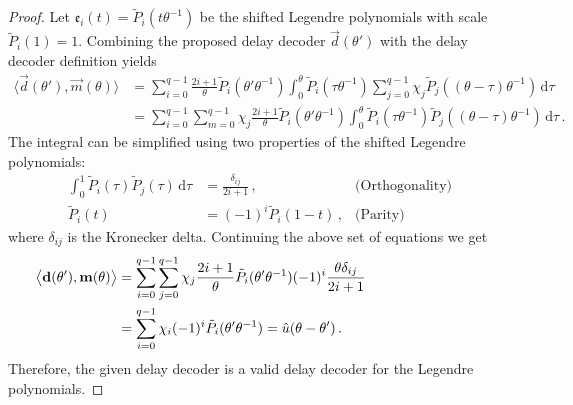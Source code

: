 \begin{proof}
	Let $\mathfrak{e}_i(t) = \tilde P_i(t \theta^{-1})$ be the shifted Legendre polynomials with scale $\tilde P_i(1) = 1$. Combining the proposed delay decoder $\vec d(\theta')$ with the delay decoder definition yields
	\begin{align*}
		\big\langle \vec d(\theta'), \vec m(\theta) \big\rangle
			&= \sum_{i = 0}^{q - 1} \frac{2i + 1}{\theta} \tilde P_i(\theta' \theta^{-1}) \int_{0}^\theta \tilde P_i(\tau \theta^{-1}) \sum_{j = 0}^{q - 1} \chi_j \tilde P_j((\theta - \tau )\theta^{-1})\,\mathrm{d}\tau \\
			&= \sum_{i = 0}^{q - 1} \sum_{m = 0}^{q - 1} \chi_j \frac{2i + 1}{\theta} \tilde P_i(\theta' \theta^{-1}) \int_{0}^\theta \tilde P_i(\tau \theta^{-1}) \tilde P_j((\theta - \tau )\theta^{-1})\,\mathrm{d}\tau \,.
	\end{align*}
	The integral can be simplified using two properties of the shifted Legendre polynomials:
	\begin{align*}
		\int_0^1 \tilde P_i(\tau) \tilde P_j(\tau) \, \mathrm{d}\tau &= \frac{\delta_{ij}}{2i + 1} \,, & \text{(Orthogonality)}  \\
		\tilde P_i(t) &= (-1)^i \tilde P_i(1 - t) \,, & \text{(Parity)}
	\end{align*}
	where $\delta_{ij}$ is the Kronecker delta. Continuing the above set of equations we get
	\begin{align*}
		\big\langle \vec d(\theta'), \vec m(\theta) \big\rangle
			&= \sum_{i = 0}^{q - 1} \sum_{j = 0}^{q - 1} \chi_j \frac{2i + 1}{\theta} \tilde P_i(\theta' \theta^{-1}) (-1)^i \frac{\theta \delta_{ij} }{2i + 1} \hspace{2.97cm}\\
			&= \sum_{i = 0}^{q - 1} \chi_i (-1)^i \tilde P_i(\theta' \theta^{-1})
			 = \hat u(\theta - \theta') \,.
	\end{align*}
	Therefore, the given delay decoder is a valid delay decoder for the Legendre polynomials.
\end{proof}